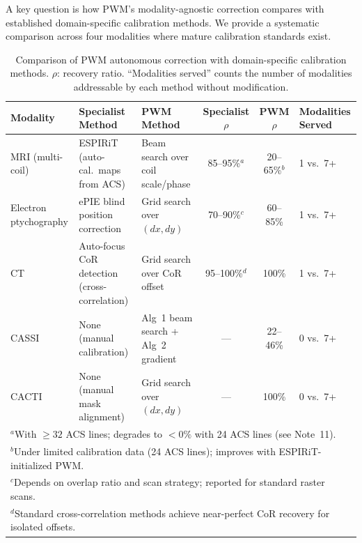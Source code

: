 \documentclass[11pt]{article}
\begin{document}
A key question is how PWM's modality-agnostic correction compares with established domain-specific calibration methods. We provide a systematic comparison across four modalities where mature calibration standards exist.

\begin{table}[ht]
\centering\small
\caption{Comparison of PWM autonomous correction with domain-specific calibration methods. $\rho$: recovery ratio. ``Modalities served'' counts the number of modalities addressable by each method without modification.}
\label{tab:calibration_comparison}
\begin{tabular}{@{}p{1.8cm}p{2.0cm}p{2.0cm}ccp{1.8cm}@{}}
\toprule
\textbf{Modality} & \textbf{Specialist Method} & \textbf{PWM Method} & \textbf{Specialist $\rho$} & \textbf{PWM $\rho$} & \textbf{Modalities Served} \\
\midrule
MRI (multi-coil) & ESPIRiT~\cite{uecker2014espirit} (auto-cal.\ maps from ACS) & Beam search over coil scale/phase & 85--95\%$^a$ & 20--65\%$^b$ & 1 vs.\ 7+ \\
\addlinespace
Electron ptychography & ePIE blind position correction~\cite{maiden2009ptychography} & Grid search over $(dx, dy)$ & 70--90\%$^c$ & 60--85\% & 1 vs.\ 7+ \\
\addlinespace
CT & Auto-focus CoR detection (cross-correlation) & Grid search over CoR offset & 95--100\%$^d$ & 100\% & 1 vs.\ 7+ \\
\addlinespace
CASSI & None (manual calibration) & Alg~1 beam search + Alg~2 gradient & --- & 22--46\% & 0 vs.\ 7+ \\
\addlinespace
CACTI & None (manual mask alignment) & Grid search over $(dx,dy)$ & --- & 100\% & 0 vs.\ 7+ \\
\bottomrule
\multicolumn{6}{l}{\footnotesize $^a$With $\geq 32$ ACS lines; degrades to $<0\%$ with 24 ACS lines (see Note~11).}\\
\multicolumn{6}{l}{\footnotesize $^b$Under limited calibration data (24 ACS lines); improves with ESPIRiT-initialized PWM.}\\
\multicolumn{6}{l}{\footnotesize $^c$Depends on overlap ratio and scan strategy; reported for standard raster scans.}\\
\multicolumn{6}{l}{\footnotesize $^d$Standard cross-correlation methods achieve near-perfect CoR recovery for isolated offsets.}
\end{tabular}
\end{table}
\end{document}
